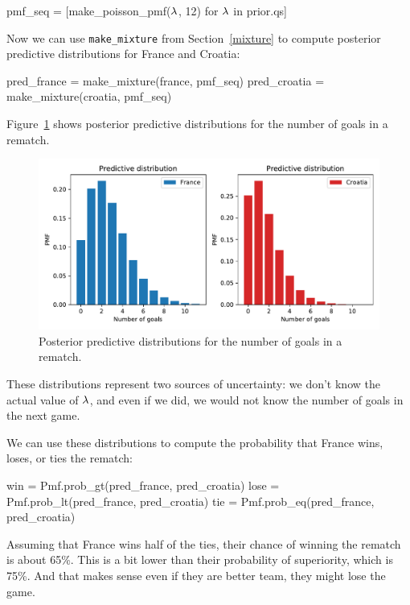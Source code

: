 \documentclass[12pt]{book}
\theoremstyle{exercise}
\newcommand{\py}[1]{{\tt #1}}%
\begin{document}
\begin{code}
pmf_seq = [make_poisson_pmf($\mathtt{\lambda}$, 12) for $\mathtt{\lambda}$ in prior.qs]
\end{code}

Now we can use \py{make_mixture} from Section~\ref{mixture} to compute posterior predictive distributions for France and Croatia:

\begin{code}
pred_france = make_mixture(france, pmf_seq)
pred_croatia = make_mixture(croatia, pmf_seq)
\end{code}

Figure~\ref{fig07-04} shows posterior predictive distributions for the number of goals in a rematch.

\begin{figure}
\centerline{\includegraphics[width=5.5in]{figs/fig07-04.pdf}}
\caption{Posterior predictive distributions for the number of goals in a rematch.}
\label{fig07-04}
\end{figure}

These distributions represent two sources of uncertainty: we don't know the actual value of $\mathtt{\lambda}$, and even if we did, we would not know the number of goals in the next game.

We can use these distributions to compute the probability that France wins, loses, or ties the rematch:

\begin{code}
win = Pmf.prob_gt(pred_france, pred_croatia)
lose = Pmf.prob_lt(pred_france, pred_croatia)
tie = Pmf.prob_eq(pred_france, pred_croatia)
\end{code}

Assuming that France wins half of the ties, their chance of winning the rematch is about 65\%.
This is a bit lower than their probability of superiority, which is 75\%. And that makes sense even if they are better team, they might lose the game.
\end{document}
